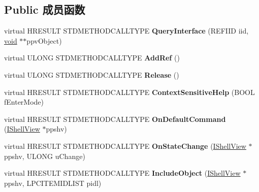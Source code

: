 \subsection*{Public 成员函数}
\begin{DoxyCompactItemize}
\item 
\mbox{\label{struct_i_shell_browser_impl_a39e7e155a958cda84cfde558c555b65e}} 
virtual H\+R\+E\+S\+U\+LT S\+T\+D\+M\+E\+T\+H\+O\+D\+C\+A\+L\+L\+T\+Y\+PE {\bfseries Query\+Interface} (R\+E\+F\+I\+ID iid, \hyperlink{interfacevoid}{void} $\ast$$\ast$ppv\+Object)
\item 
\mbox{\label{struct_i_shell_browser_impl_a868a528b187ca93e5a89abfd39121a5e}} 
virtual U\+L\+O\+NG S\+T\+D\+M\+E\+T\+H\+O\+D\+C\+A\+L\+L\+T\+Y\+PE {\bfseries Add\+Ref} ()
\item 
\mbox{\label{struct_i_shell_browser_impl_aa136adf12349f35463f2bac200537f8e}} 
virtual U\+L\+O\+NG S\+T\+D\+M\+E\+T\+H\+O\+D\+C\+A\+L\+L\+T\+Y\+PE {\bfseries Release} ()
\item 
\mbox{\label{struct_i_shell_browser_impl_a574288187947ee7c61894e5df45935b9}} 
virtual H\+R\+E\+S\+U\+LT S\+T\+D\+M\+E\+T\+H\+O\+D\+C\+A\+L\+L\+T\+Y\+PE {\bfseries Context\+Sensitive\+Help} (B\+O\+OL f\+Enter\+Mode)
\item 
\mbox{\label{struct_i_shell_browser_impl_a3a6623a7bf4df5e4488f390fd217907b}} 
virtual H\+R\+E\+S\+U\+LT S\+T\+D\+M\+E\+T\+H\+O\+D\+C\+A\+L\+L\+T\+Y\+PE {\bfseries On\+Default\+Command} (\hyperlink{interface_i_shell_view}{I\+Shell\+View} $\ast$ppshv)
\item 
\mbox{\label{struct_i_shell_browser_impl_a22746566c42c1804be50a51f7a3b07e2}} 
virtual H\+R\+E\+S\+U\+LT S\+T\+D\+M\+E\+T\+H\+O\+D\+C\+A\+L\+L\+T\+Y\+PE {\bfseries On\+State\+Change} (\hyperlink{interface_i_shell_view}{I\+Shell\+View} $\ast$ppshv, U\+L\+O\+NG u\+Change)
\item 
\mbox{\label{struct_i_shell_browser_impl_af4941f778509e2322b5d1d7b99b14086}} 
virtual H\+R\+E\+S\+U\+LT S\+T\+D\+M\+E\+T\+H\+O\+D\+C\+A\+L\+L\+T\+Y\+PE {\bfseries Include\+Object} (\hyperlink{interface_i_shell_view}{I\+Shell\+View} $\ast$ppshv, L\+P\+C\+I\+T\+E\+M\+I\+D\+L\+I\+ST pidl)
$$
\end{DoxyCompactItemize}

